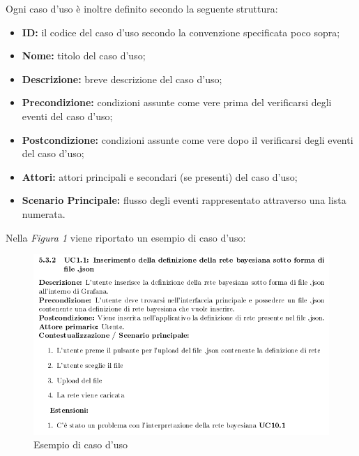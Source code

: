 	    Ogni caso d'uso è inoltre definito secondo la seguente struttura:\newline
	    \begin{itemize}
	    	\item \textbf{ID:} il codice del caso d'uso secondo la convenzione specificata poco sopra;
	    	\item \textbf{Nome:} titolo del caso d'uso;
	    	\item \textbf{Descrizione:} breve descrizione del caso d'uso;
	    	\item \textbf{Precondizione:} condizioni assunte come vere prima del verificarsi degli eventi del caso d'uso;
	    	\item \textbf{Postcondizione:} condizioni assunte come vere dopo il verificarsi degli eventi del caso d'uso;
	    	\item \textbf{Attori:} attori principali e secondari (se presenti) del caso d'uso;
	    	\item \textbf{Scenario Principale:} flusso degli eventi rappresentato attraverso una lista numerata.\newline
	    \end{itemize}
	    Nella \textit{Figura 1} viene riportato un esempio di caso d'uso:\newline
    
	    \begin{figure}[!htbp]
	    	\centering
	    	\includegraphics[scale=0.7]{casoduso.png}
	    	\caption{Esempio di caso d'uso}
	    \end{figure}
    
